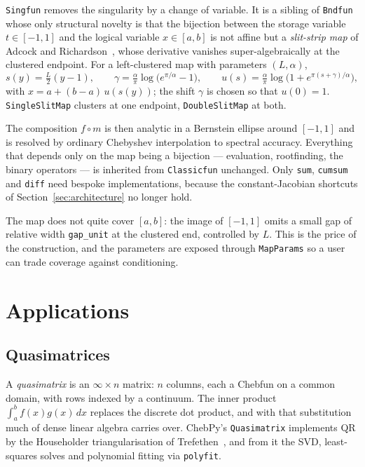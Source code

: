\documentclass[11pt,a4paper]{article}
\newcommand{\code}[1]{\texttt{#1}}
\begin{document}
\code{Singfun} removes the singularity by a change of variable. It is a sibling
of \code{Bndfun} whose only structural novelty is that the bijection between
the storage variable $t \in [-1,1]$ and the logical variable $x \in [a,b]$ is
not affine but a \emph{slit-strip map} of Adcock and
Richardson~\cite{adcock2013}, whose derivative vanishes super-algebraically at
the clustered endpoint. For a left-clustered map with parameters $(L, \alpha)$,
\begin{equation}
  s(y) = \tfrac{L}{2}(y - 1), \qquad
  \gamma = \tfrac{\alpha}{\pi}\log\!\bigl(e^{\pi/\alpha} - 1\bigr), \qquad
  u(s) = \tfrac{\alpha}{\pi}
         \log\!\bigl(1 + e^{\pi (s + \gamma)/\alpha}\bigr),
  \label{eq:slit}
\end{equation}
with $x = a + (b-a)\,u(s(y))$; the shift $\gamma$ is chosen so that $u(0) = 1$.
\code{SingleSlitMap} clusters at one endpoint, \code{DoubleSlitMap} at both.

The composition $f \circ m$ is then analytic in a Bernstein ellipse around
$[-1,1]$ and is resolved by ordinary Chebyshev interpolation to spectral
accuracy. Everything that depends only on the map being a bijection ---
evaluation, rootfinding, the binary operators --- is inherited from
\code{Classicfun} unchanged. Only \code{sum}, \code{cumsum} and \code{diff}
need bespoke implementations, because the constant-Jacobian shortcuts of
Section~\ref{sec:architecture} no longer hold.

The map does not quite cover $[a,b]$: the image of $[-1,1]$ omits a small gap
of relative width \code{gap\_unit} at the clustered end, controlled by $L$.
This is the price of the construction, and the parameters are exposed through
\code{MapParams} so a user can trade coverage against conditioning.

\section{Applications}
\label{sec:apps}

\subsection{Quasimatrices}
\label{sec:quasi}

A \emph{quasimatrix} is an $\infty \times n$ matrix: $n$ columns, each a
Chebfun on a common domain, with rows indexed by a continuum. The inner product
$\int_a^b f(x) g(x)\, dx$ replaces the discrete dot product, and with that
substitution much of dense linear algebra carries over. ChebPy's
\code{Quasimatrix} implements QR by the Householder triangularisation of
Trefethen~\cite{trefethen2010}, and from it the SVD, least-squares solves and
polynomial fitting via \code{polyfit}.
\end{document}
